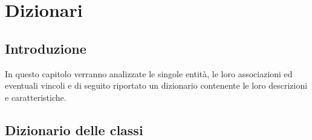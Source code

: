 \chapter{Dizionari}
\section{Introduzione}
In questo capitolo verranno analizzate le singole entità, le loro associazioni ed eventuali vincoli e di seguito riportato un dizionario contenente le loro descrizioni e caratteristiche. 

\section{Dizionario delle classi}

\begingroup
    \setlength{\tabcolsep}{6pt}
    \renewcommand{\arraystretch}{1.5}
